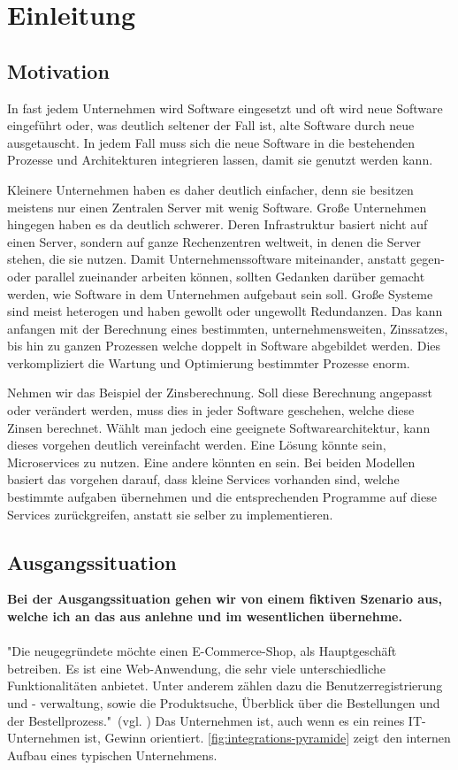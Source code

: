 \chapter{Einleitung}
\label{chap:einleitung}

\section{Motivation}
\label{sec:motivation}
In fast jedem Unternehmen wird Software eingesetzt und oft wird neue Software eingeführt oder, was deutlich seltener der Fall ist, alte Software durch neue ausgetauscht. In jedem Fall muss sich die neue Software in die bestehenden Prozesse und Architekturen integrieren lassen, damit sie genutzt werden kann.

Kleinere Unternehmen haben es daher deutlich einfacher, denn sie besitzen meistens nur einen Zentralen Server mit wenig Software. Große Unternehmen hingegen haben es da deutlich schwerer. Deren Infrastruktur basiert nicht auf einen Server, sondern auf ganze Rechenzentren weltweit, in denen die Server stehen, die sie nutzen. Damit Unternehmenssoftware miteinander, anstatt gegen- oder parallel zueinander arbeiten können, sollten Gedanken darüber gemacht werden, wie Software in dem Unternehmen aufgebaut sein soll. Große Systeme sind meist heterogen und haben gewollt oder ungewollt Redundanzen. Das kann anfangen mit der Berechnung eines bestimmten, unternehmensweiten, Zinssatzes, bis hin zu ganzen Prozessen welche doppelt in Software abgebildet werden. Dies verkompliziert die Wartung und Optimierung bestimmter Prozesse enorm.

Nehmen wir das Beispiel der Zinsberechnung. Soll diese Berechnung angepasst oder verändert werden, muss dies in jeder Software geschehen, welche diese Zinsen berechnet. Wählt man jedoch eine geeignete Softwarearchitektur, kann dieses vorgehen deutlich vereinfacht werden. Eine Lösung könnte sein, Microservices zu nutzen. Eine andere könnten \SOA en sein. Bei beiden Modellen basiert das vorgehen darauf, dass kleine Services vorhanden sind, welche bestimmte aufgaben übernehmen und die entsprechenden Programme auf diese Services zurückgreifen, anstatt sie selber zu implementieren.

\section{Ausgangssituation}
\label{sec:ausgangssituation}
\textbf{Bei der Ausgangssituation gehen wir von einem fiktiven Szenario aus, welche ich an das aus \cite[S. 15]{EWolff2016} anlehne und im wesentlichen übernehme.}
\\\\ 
"Die neugegründete \textit{\gmbh} möchte einen E-Commerce-Shop, als Hauptgeschäft betreiben. Es ist eine Web-Anwendung, die sehr viele unterschiedliche Funktionalitäten anbietet. Unter anderem zählen dazu die Benutzerregistrierung und - verwaltung, sowie die Produktsuche, Überblick über die Bestellungen und der Bestellprozess."\ (vgl. \cite[S. 15]{EWolff2016})
Das Unternehmen ist, auch wenn es ein reines IT-Unternehmen ist, Gewinn orientiert. \ref{fig:integrations-pyramide} zeigt den internen Aufbau eines typischen Unternehmens.

